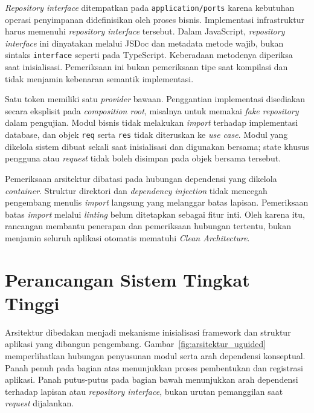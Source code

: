 \documentclass[12pt,a4paper,oneside]{report}
\begin{document}
\textit{Repository interface} ditempatkan pada \texttt{application/\allowbreak ports} karena kebutuhan operasi penyimpanan didefinisikan oleh proses bisnis. Implementasi infrastruktur harus memenuhi \textit{repository interface} tersebut. Dalam JavaScript, \textit{repository interface} ini dinyatakan melalui JSDoc dan metadata metode wajib, bukan sintaks \texttt{interface} seperti pada TypeScript. Keberadaan metodenya diperiksa saat inisialisasi. Pemeriksaan ini bukan pemeriksaan tipe saat kompilasi dan tidak menjamin kebenaran semantik implementasi.

Satu token memiliki satu \textit{provider} bawaan. Penggantian implementasi disediakan secara eksplisit pada \textit{composition root}, misalnya untuk memakai \textit{fake repository} dalam pengujian. Modul bisnis tidak melakukan \textit{import} terhadap implementasi database, dan objek \texttt{req} serta \texttt{res} tidak diteruskan ke \textit{use case}. Modul yang dikelola sistem dibuat sekali saat inisialisasi dan digunakan bersama; state khusus pengguna atau \textit{request} tidak boleh disimpan pada objek bersama tersebut.

Pemeriksaan arsitektur dibatasi pada hubungan dependensi yang dikelola \textit{container}. Struktur direktori dan \textit{dependency injection} tidak mencegah pengembang menulis \textit{import} langsung yang melanggar batas lapisan. Pemeriksaan batas \textit{import} melalui \textit{linting} belum ditetapkan sebagai fitur inti. Oleh karena itu, rancangan membantu penerapan dan pemeriksaan hubungan tertentu, bukan menjamin seluruh aplikasi otomatis mematuhi \textit{Clean Architecture}.

\section{Perancangan Sistem Tingkat Tinggi}
\label{sec:arsitektur_tingkat_tinggi}
Arsitektur dibedakan menjadi mekanisme inisialisasi framework dan struktur aplikasi yang dibangun pengembang. Gambar~\ref{fig:arsitektur_uguided} memperlihatkan hubungan penyusunan modul serta arah dependensi konseptual. Panah penuh pada bagian atas menunjukkan proses pembentukan dan registrasi aplikasi. Panah putus-putus pada bagian bawah menunjukkan arah dependensi terhadap lapisan atau \textit{repository interface}, bukan urutan pemanggilan saat \textit{request} dijalankan.
\end{document}
